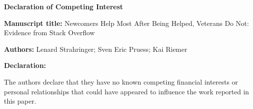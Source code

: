 \documentclass[12pt]{article}
\begin{document}
\begin{center}
{\Large\bfseries Declaration of Competing Interest\par}
\vspace{1em}
\end{center}

\noindent\textbf{Manuscript title:} Newcomers Help Most After Being Helped, Veterans Do Not: Evidence from Stack Overflow

\vspace{1em}

\noindent\textbf{Authors:} Lenard Strahringer; Sven Eric Pruess; Kai Riemer

\vspace{1em}

\noindent\textbf{Declaration:}

\vspace{0.5em}

\noindent The authors declare that they have no known competing financial interests or personal relationships that could have appeared to influence the work reported in this paper.
\end{document}
